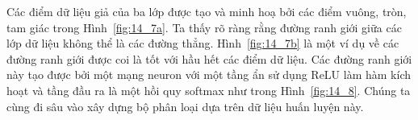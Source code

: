 
Các điểm dữ liệu giả của ba lớp được tạo và minh hoạ bởi các điểm vuông, tròn,
tam giác trong Hình~\ref{fig:14_7a}. Ta thấy rõ ràng rằng đường ranh giới giữa
các lớp dữ liệu không thể là các đường thẳng. Hình~\ref{fig:14_7b} là một ví dụ
về các đường ranh giới được coi là tốt với hầu hết các điểm dữ liệu. Các đường
ranh giới này tạo được bởi một mạng neuron với một tầng ẩn sử dụng ReLU làm hàm
kích hoạt và tầng đầu ra là một hồi quy softmax như trong Hình~\ref{fig:14_8}.
Chúng ta cùng đi sâu vào xây dựng bộ phân loại dựa trên dữ liệu huấn luyện này.%

